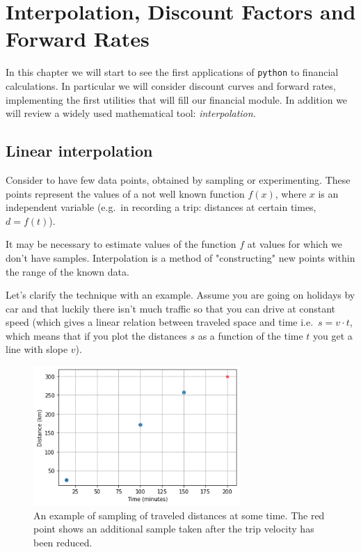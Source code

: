 \chapter{Interpolation, Discount Factors and Forward Rates}\label{interpolation---practical-lesson-3}

In this chapter we will start to see the first applications of \texttt{python} to financial calculations.
In particular we will consider discount curves and forward rates, implementing the first utilities that will fill our financial module.
In addition we will review a widely used mathematical tool: \emph{interpolation}.

\section{Linear interpolation}\label{linear-interpolation}

Consider to have few data points, obtained by sampling or experimenting. These points represent the values of a not well known function \(f(x)\), where \(x\) is an independent variable (e.g.~in recording a trip: distances at certain times, \(d = f(t)\)).

It may be necessary to estimate values of the function $f$ at values for which we don't have samples.
Interpolation is a method of "constructing" new points within the range of the known data.

Let's clarify the technique with an example.
Assume you are going on holidays by car and that luckily there isn't much traffic so that you can drive at constant speed (which gives a linear relation between traveled space and time i.e.~\(s = v \cdot t\), which means that if you plot the distances \(s\) as a function of the time \(t\) you get a line with slope \(v\)).

\begin{figure}
  \centering
  \includegraphics[width=0.7\textwidth]{interp_example1.png}
  \caption{An example of sampling of traveled distances at some time. The red point shows an additional sample taken after the trip velocity has been reduced.}
\end{figure}

